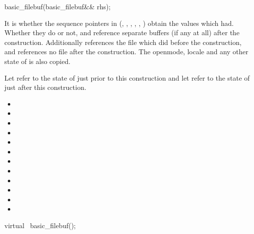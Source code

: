 %
\begin{itemdecl}
basic_filebuf(basic_filebuf&& rhs);
\end{itemdecl}

\begin{itemdescr}
\pnum
\effects
It is  whether the sequence pointers in 
(, , ,
, , ) obtain
the values which  had. Whether they do or not, 
and  reference separate buffers (if any at all) after the
construction. Additionally  references the file
which  did before the construction, and
 references no file after the construction. The
openmode, locale and any other state of  is also
copied.

\pnum
\ensures
Let  refer to the state of
 just prior to this construction and let 
refer to the state of  just after this construction.

\begin{itemize}
\item {}
\item {}
\item {}
\item {}
\item {}
\item {}
\item {}
\item {}
\item {}
\item {}
\item {}
\item {}
\end{itemize}
\end{itemdescr}

%
\begin{itemdecl}
virtual ~basic_filebuf();
\end{itemdecl}

